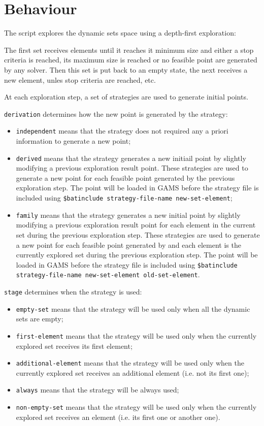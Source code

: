 \documentclass{article}
\begin{document}
\section*{Behaviour}

The script explores the dynamic sets space using a depth-first exploration:

The first set receives elements until it reaches it minimum size and either a
stop criteria is reached, its maximum size is reached or no feasible point are
generated by any solver. Then this set is put back to an empty state, the next
receives a new element, unles stop criteria are reached, etc.

At each exploration step, a set of strategies are used to generate initial
points.

\texttt{derivation} determines how the new point is generated by the strategy:
\begin{itemize}
\item \texttt{independent} means that the strategy does not required any a
  priori information to generate a new point;
\item \texttt{derived} means that the strategy generates a new initiail point by
  slightly modifying a previous exploration result point. These strategies are
  used to generate a new point for each feasible point generated by the previous
  exploration step. The point will be loaded in GAMS before the strategy file is
  included using \texttt{\$batinclude strategy-file-name new-set-element};
\item \texttt{family} means that the strategy generates a new initial point by
  slightly modifying a previous exploration result point for each element in the
  current set during the previous exploration step. These strategies are used to
  generate a new point for each feasible point generated by and each element is
  the currently explored set during the previous exploration step. The point
  will be loaded in GAMS before the strategy file is included using
  \texttt{\$batinclude strategy-file-name new-set-element old-set-element}.
\end{itemize}

\texttt{stage} determines when the strategy is used:
\begin{itemize}
\item \texttt{empty-set} means that the strategy will be used only when all the
  dynamic sets are empty;
\item \texttt{first-element} means that the strategy will be used only when the
  currently explored set receives its first element;
\item \texttt{additional-element} means that the strategy will be used only when
  the currently explored set receives an additional element (i.e. not its first
  one);
\item \texttt{always} means that the strategy will be always used;
\item \texttt{non-empty-set} means that the strategy will be used only when the
  currently explored set receives an element (i.e. its first one or another
  one).
\end{itemize}
\end{document}

